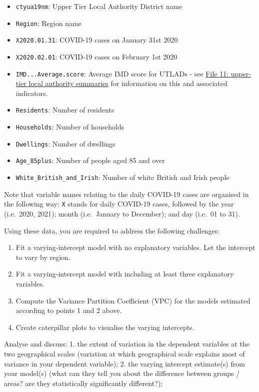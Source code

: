 \documentclass[
]{book}
\providecommand{\tightlist}{%
  \setlength{\itemsep}{0pt}\setlength{\parskip}{0pt}}
\begin{document}
\begin{itemize}
\tightlist
\item
  \texttt{ctyua19nm}: Upper Tier Local Authority District name
\item
  \texttt{Region}: Region name
\item
  \texttt{X2020.01.31}: COVID-19 cases on January 31st 2020
\item
  \texttt{X2020.02.01}: COVID-19 cases on February 1st 2020
\item
  \texttt{IMD...Average.score}: Average IMD score for UTLADs - see \href{https://www.gov.uk/government/statistics/english-indices-of-deprivation-2019}{File 11: upper-tier local authority summaries} for information on this and associated indicators.
\item
  \texttt{Residents}: Number of residents
\item
  \texttt{Households}: Number of households
\item
  \texttt{Dwellings}: Number of dwellings
\item
  \texttt{Age\_85plus}: Number of people aged 85 and over
\item
  \texttt{White\_British\_and\_Irish}: Number of white British and Irish people
\end{itemize}

Note that variable names relating to the daily COVID-19 cases are organised in the following way: \texttt{X} stands for daily COVID-19 cases, followed by the year (i.e.~2020, 2021); month (i.e.~January to December); and day (i.e.~01 to 31).

Using these data, you are required to address the following challenges:

\begin{enumerate}
\def\labelenumi{\arabic{enumi}.}
\item
  Fit a varying-intercept model with no explanatory variables. Let the intercept to vary by region.
\item
  Fit a varying-intercept model with including at least three explanatory variables.
\item
  Compute the Variance Partition Coefficient (VPC) for the models estimated according to points 1 and 2 above.
\item
  Create caterpillar plots to visualise the varying intercepts.
\end{enumerate}

Analyse and discuss:
1. the extent of variation in the dependent variables at the two geographical scales (variation at which
geographical scale explains most of variance in your dependent variable);
2. the varying intercept estimate(s) from your model(s) (what can they tell you about the difference
between groups / areas? are they statistically significantly different?);
\end{document}
